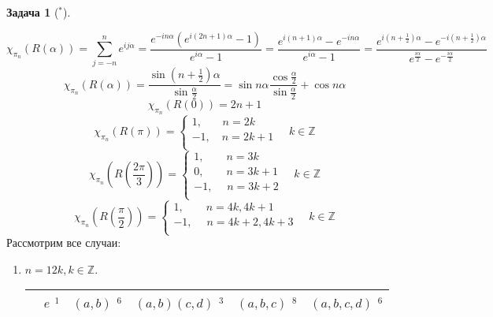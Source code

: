 \documentclass[12pt]{article}
\theoremstyle{definition}
\newtheorem{zad}{Задача}[section]
\begin{document}
\begin{zad}[$^*$]
\begin{itemize}
\begin{equation*}
    \chi_{\pi_n}(R(\alpha))=\sum\limits_{j=-n}^ne^{ij\alpha}=\frac{e^{-in\alpha}(e^{i(2n+1)\alpha}-1)}{e^{i\alpha}-1}=\frac{e^{i(n+1)\alpha}-e^{-in\alpha}}{e^{i\alpha}-1}=\frac{e^{i(n+\frac{1}{2})\alpha}-e^{-i(n+\frac{1}{2})\alpha}}{e^{\frac{i\alpha}{2}}-e^{-\frac{i\alpha}{2}}}
\end{equation*}
\begin{equation}
    \chi_{\pi_n}(R(\alpha))=\frac{\sin(n+\frac{1}{2})\alpha}{\sin\frac{\alpha}{2}}=\sin n\alpha\frac{\cos\frac{\alpha}{2}}{\sin\frac{\alpha}{2}}+\cos n\alpha
\end{equation}
\begin{equation}
    \chi_{\pi_n}(R(0))=2n+1
\end{equation}
\begin{equation}
    \chi_{\pi_n}(R(\pi))=\left\{
        \begin{array}{l}
        1,\;\;\;\quad n=2k\\
        -1,\quad n=2k+1\\
        \end{array}
        \right.\quad k\in\mathbb{Z}
\end{equation}
\begin{equation}
    \chi_{\pi_n}\left(R\left(\frac{2\pi}{3}\right)\right)=\left\{
        \begin{array}{l}
        1,\quad\quad n=3k\\
        0,\quad\quad n=3k+1\\
        -1,\;\quad n=3k+2\\
        \end{array}
        \right.\quad k\in\mathbb{Z}
\end{equation}
\begin{equation}
    \chi_{\pi_n}\left(R\left(\frac{\pi}{2}\right)\right)=\left\{
        \begin{array}{l}
        1,\quad\quad n=4k, 4k+1\\
        -1,\;\quad n=4k+2, 4k+3\\
        \end{array}
        \right.\quad k\in\mathbb{Z}
\end{equation}
Рассмотрим все случаи:
\begin{enumerate}
    \item $n=12k,k\in\mathbb{Z}$.
    \begin{table}[h!]
    \centering
    \begin{tabular}{|l|l|l|l|l|l|}
    \hline
     & $e$ $^1$ & $(a,b)$ $^6$ & $(a,b)(c,d)$ $^3$ & $(a,b,c)$ $^8$ & $(a,b,c,d)$ $^6$ \\ \hline

\end{tabular}
\end{table}
\end{enumerate}
\end{itemize}
\end{zad}
\end{document}
